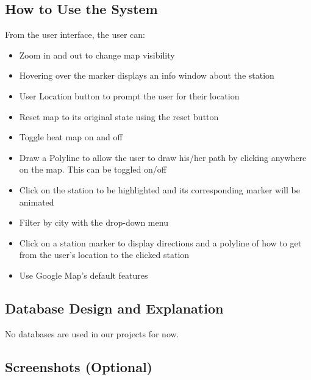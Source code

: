 \documentclass[a4paper,12pt]{article}
\begin{document}
\subsection{How to Use the System}
From the user interface, the user can:
\begin{itemize}
  \item Zoom in and out to change map visibility
  \item Hovering over the marker displays an info window about the station
  \item User Location button to prompt the user for their location
  \item Reset map to its original state using the reset button
  \item Toggle heat map on and off
  \item Draw a Polyline to allow the user to draw his/her path by clicking anywhere on the map. This can be toggled on/off
  \item Click on the station to be highlighted and its corresponding marker will be animated
  \item Filter by city with the drop-down menu
  \item Click on a station marker to display directions and a polyline of how to get from the user’s location to the clicked station
  \item Use Google Map’s default features
\end{itemize}
\subsection{Database Design and Explanation}
No databases are used in our projects for now.
\subsection{Screenshots (Optional)}
\end{document}
